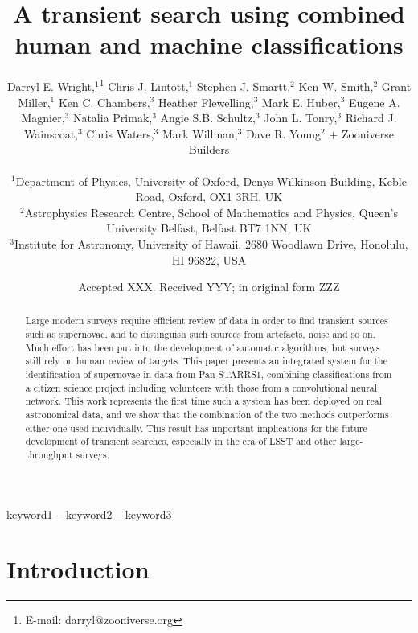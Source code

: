 \message{ !name(blank.tex)}\documentclass[a4paper,fleqn,usenatbib]{mnras}
\title[Human and machine classifications]{A transient search using combined human and machine classifications}
\author[D. Wright, C. Lintott, K. W. Smith et al.]{Darryl E. Wright,$^{1}$\thanks{E-mail: darryl@zooniverse.org}
Chris J. Lintott,$^{1}$
Stephen J. Smartt,$^{2}$
Ken W. Smith,$^{2}$\newauthor
Grant Miller,$^{1}$
Ken C. Chambers,$^{3}$
Heather Flewelling,$^{3}$
Mark E. Huber,$^{3}$\newauthor
Eugene A. Magnier,$^{3}$
Natalia Primak,$^{3}$
Angie S.B. Schultz,$^{3}$
John L. Tonry,$^{3}$\newauthor
Richard J. Wainscoat,$^{3}$
Chris Waters,$^{3}$
Mark Willman,$^{3}$
Dave R.  Young$^{2}$\newauthor
+ Zooniverse Builders\\
\\
$^{1}$Department of Physics, University of Oxford, Denys Wilkinson Building, Keble Road, Oxford, OX1 3RH, UK \\
$^{2}$Astrophysics Research Centre, School of Mathematics and Physics, Queen’s University Belfast, Belfast BT7 1NN, UK \\
$^{3}$Institute for Astronomy, University of Hawaii, 2680 Woodlawn Drive, Honolulu, HI 96822, USA \\
}
\date{Accepted XXX. Received YYY; in original form ZZZ}
\begin{document}

\label{firstpage}
\pagerange{\pageref{firstpage}--\pageref{lastpage}}
\maketitle

\begin{abstract}
Large modern surveys require efficient review of data in order to find transient sources such as supernovae, and to distinguish such sources from artefacts, noise and so on. Much effort has been put into the development of automatic algorithms, but surveys still rely on human review of targets. This paper presents an integrated system for the identification of supernovae in data from Pan-STARRS1, combining classifications from a citizen science project including volunteers with those from a convolutional neural network. This work represents the first time such a system has been deployed on real astronomical data, and we show that the combination of the two methods outperforms either one used individually. This result has important implications for the future development of transient searches, especially in the era of LSST and other large-throughput surveys. 
\end{abstract}

\begin{keywords}
keyword1 -- keyword2 -- keyword3
\end{keywords}



\section{Introduction}
\end{document}

